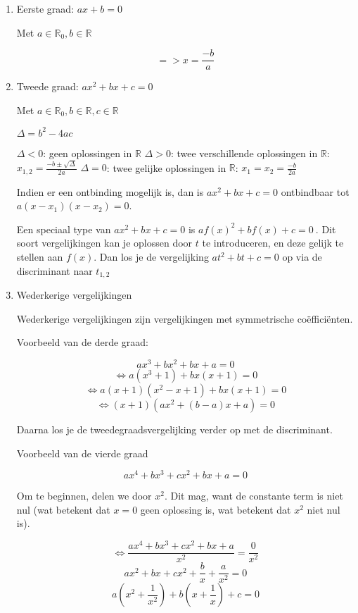\begin{enumerate}
	\item Eerste graad: \(ax + b = 0\)
	
	Met \(a \in \mathbb{R}_0, b \in \mathbb{R} \)
	
	\[=> x = \frac{-b}{a} \]
	
	\item Tweede graad: \(ax^2 + bx + c = 0\)
	
	Met \( a \in \mathbb{R}_0, b \in \mathbb{R}, c \in \mathbb{R} \)
	
	\( \Delta = b^2 - 4ac  \)
	
	\subitem \(\Delta < 0\): geen oplossingen in \(\mathbb{R}\)
	\subitem \(\Delta > 0\): twee verschillende oplossingen in \(\mathbb{R}\): \(x_{1,2} = \frac{-b \pm \sqrt{\Delta}}{2a} \)
	\subitem \(\Delta = 0\): twee gelijke oplossingen in \(\mathbb{R}\): \(x_1 = x_2 = \frac{-b}{2a}\)
	
	Indien er een ontbinding mogelijk is, dan is \( ax^2 + bx + c = 0 \) ontbindbaar tot \( a(x-x_1)(x-x_2) = 0\).
	
	Een speciaal type van \(ax^2 + bx + c = 0\) is \( af(x)^2 + bf(x) + c = 0\ \). Dit soort vergelijkingen kan je oplossen door \(t\) te introduceren, en deze gelijk te stellen aan \(f(x)\). Dan los je de vergelijking \( at^2 + bt + c = 0 \) op via de discriminant naar \(t_{1,2}\)
	
	\item Wederkerige vergelijkingen
	
	Wederkerige vergelijkingen zijn vergelijkingen met symmetrische coëfficiënten.
	
	\subitem Voorbeeld van de derde graad:
	
	\[ax^3 + bx^2 + bx + a = 0\]
	\[\iff a(x^3 + 1) + bx(x + 1) = 0\]
	\[\iff a(x+1)(x^2 - x + 1) + bx(x + 1) = 0 \]
	\[\iff (x+1)(ax^2 + (b-a)x + a) = 0 \]
	
	Daarna los je de tweedegraadsvergelijking verder op met de discriminant.
	
	\subitem Voorbeeld van de vierde graad
	
	\[ ax^4 + bx^3 + cx^2 + bx + a = 0 \]
	
	Om te beginnen, delen we door \(x^2\).	Dit mag, want de constante term is niet nul (wat betekent dat \(x=0\) geen oplossing is, wat betekent dat \(x^2\) niet nul is).
	
	\[ \iff \frac{ax^4 + bx^3 + cx^2 + bx + a}{x^2} = \frac{0}{x^2} \]
	\[ ax^2 + bx + cx^2 + \frac{b}{x} + \frac{a}{x^2} = 0 \]
	\[ a(x^2 + \frac{1}{x^2}) + b(x+\frac{1}{x}) + c = 0 \]
	

\end{enumerate}
